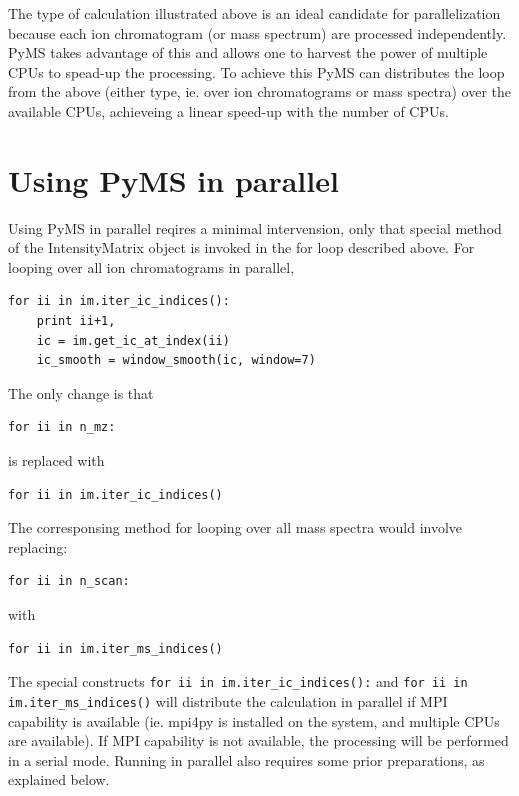 The type of calculation illustrated above is an ideal candidate
for parallelization because each ion chromatogram (or mass
spectrum) are processed independently. PyMS takes advantage
of this and allows one to harvest the power of multiple CPUs
to spead-up the processing. To achieve this PyMS can distributes
the loop from the above (either type, ie. over ion chromatograms
or mass spectra) over the available CPUs, achieveing a linear
speed-up with the number of CPUs.


\section{\label{sec:parallel-pyms}Using PyMS in parallel}

Using PyMS in parallel reqires a minimal intervension, only
that special method of the IntensityMatrix object is invoked
in the for loop described above. For looping over all ion
chromatograms in parallel,

\begin{verbatim}
for ii in im.iter_ic_indices():
    print ii+1,
    ic = im.get_ic_at_index(ii)
    ic_smooth = window_smooth(ic, window=7)
\end{verbatim}

The only change is that 

\begin{verbatim}
for ii in n_mz:
\end{verbatim}

is replaced with

\begin{verbatim}
for ii in im.iter_ic_indices()
\end{verbatim}

The corresponsing method for looping over all mass spectra
would involve replacing:

\begin{verbatim}
for ii in n_scan:
\end{verbatim}

with

\begin{verbatim}
for ii in im.iter_ms_indices()
\end{verbatim}

The special constructs {\tt for ii in im.iter\_ic\_indices():} and
{\tt for ii in im.iter\_ms\_indices()} will distribute the calculation
in parallel if MPI capability is available (ie. mpi4py is installed
on the system, and multiple CPUs are available). If MPI capability
is not available, the processing will be performed in a serial mode.
Running in parallel also requires some prior preparations, as explained
below.

